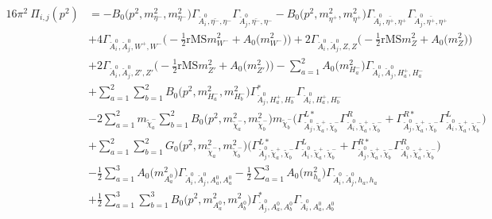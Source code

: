 \begin{itemize}
\begin{align} 
16\pi^2 \ \Pi_{i,j}(p^2) &= - {B_0\Big(p^{2},m^2_{\eta^-},m^2_{\eta^-}\Big)} {\Gamma_{\check{A}^0_{{i}},\bar{\eta^-},\eta^-}} {\Gamma_{\check{A}^0_{{j}},\bar{\eta^-},\eta^-}} - {B_0\Big(p^{2},m^2_{\eta^+},m^2_{\eta^+}\Big)} {\Gamma_{\check{A}^0_{{i}},\bar{\eta^+},\eta^+}} {\Gamma_{\check{A}^0_{{j}},\bar{\eta^+},\eta^+}} \nonumber \\ 
 &+4 {\Gamma_{\check{A}^0_{{i}},\check{A}^0_{{j}},W^+,W^-}} \Big(-\frac{1}{2} \text{rMS} m^2_{W^-}  + {A_0\Big(m^2_{W^-}\Big)}\Big)+2 {\Gamma_{\check{A}^0_{{i}},\check{A}^0_{{j}},Z,Z}} \Big(-\frac{1}{2} \text{rMS} m^2_{Z}  + {A_0\Big(m^2_{Z}\Big)}\Big)\nonumber \\ 
 &+2 {\Gamma_{\check{A}^0_{{i}},\check{A}^0_{{j}},{Z'},{Z'}}} \Big(-\frac{1}{2} \text{rMS} m^2_{{Z'}}  + {A_0\Big(m^2_{{Z'}}\Big)}\Big)- \sum_{a=1}^{2}{A_0\Big(m^2_{H^-_{{a}}}\Big)} {\Gamma_{\check{A}^0_{{i}},\check{A}^0_{{j}},H^+_{{a}},H^-_{{a}}}}  \nonumber \\ 
 &+\sum_{a=1}^{2}\sum_{b=1}^{2}{B_0\Big(p^{2},m^2_{H^-_{{a}}},m^2_{H^-_{{b}}}\Big)} {\Gamma^*_{\check{A}^0_{{j}},H^+_{{a}},H^-_{{b}}}} {\Gamma_{\check{A}^0_{{i}},H^+_{{a}},H^-_{{b}}}} \nonumber \\ 
 &-2 \sum_{a=1}^{2}m_{\tilde{\chi}^-_{{a}}} \sum_{b=1}^{2}{B_0\Big(p^{2},m^2_{\tilde{\chi}^-_{{a}}},m^2_{\tilde{\chi}^-_{{b}}}\Big)} m_{\tilde{\chi}^-_{{b}}} \Big({\Gamma^{L*}_{\check{A}^0_{{j}},\tilde{\chi}^+_{{a}},\tilde{\chi}^-_{{b}}}} {\Gamma^R_{\check{A}^0_{{i}},\tilde{\chi}^+_{{a}},\tilde{\chi}^-_{{b}}}}  + {\Gamma^{R*}_{\check{A}^0_{{j}},\tilde{\chi}^+_{{a}},\tilde{\chi}^-_{{b}}}} {\Gamma^L_{\check{A}^0_{{i}},\tilde{\chi}^+_{{a}},\tilde{\chi}^-_{{b}}}} \Big)  \nonumber \\ 
 &+\sum_{a=1}^{2}\sum_{b=1}^{2}{G_0\Big(p^{2},m^2_{\tilde{\chi}^-_{{a}}},m^2_{\tilde{\chi}^-_{{b}}}\Big)} \Big({\Gamma^{L*}_{\check{A}^0_{{j}},\tilde{\chi}^+_{{a}},\tilde{\chi}^-_{{b}}}} {\Gamma^L_{\check{A}^0_{{i}},\tilde{\chi}^+_{{a}},\tilde{\chi}^-_{{b}}}}  + {\Gamma^{R*}_{\check{A}^0_{{j}},\tilde{\chi}^+_{{a}},\tilde{\chi}^-_{{b}}}} {\Gamma^R_{\check{A}^0_{{i}},\tilde{\chi}^+_{{a}},\tilde{\chi}^-_{{b}}}} \Big)\nonumber \\ 
 &-\frac{1}{2} \sum_{a=1}^{3}{A_0\Big(m^2_{A^0_{{a}}}\Big)} {\Gamma_{\check{A}^0_{{i}},\check{A}^0_{{j}},A^0_{{a}},A^0_{{a}}}}  -\frac{1}{2} \sum_{a=1}^{3}{A_0\Big(m^2_{h_{{a}}}\Big)} {\Gamma_{\check{A}^0_{{i}},\check{A}^0_{{j}},h_{{a}},h_{{a}}}}  \nonumber \\ 
 &+\frac{1}{2} \sum_{a=1}^{3}\sum_{b=1}^{3}{B_0\Big(p^{2},m^2_{A^0_{{a}}},m^2_{A^0_{{b}}}\Big)} {\Gamma^*_{\check{A}^0_{{j}},A^0_{{a}},A^0_{{b}}}} {\Gamma_{\check{A}^0_{{i}},A^0_{{a}},A^0_{{b}}}}  \nonumber \\ 

\end{align}
\end{itemize}
